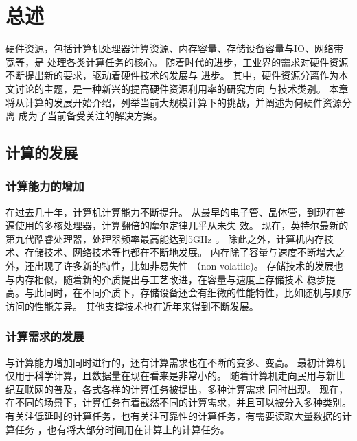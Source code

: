 \chapter{总述} %

\label{Chapter1} %

硬件资源，包括计算机处理器计算资源、内存容量、存储设备容量与IO、网络带宽等，是
处理各类计算任务的核心。
随着时代的进步，工业界的需求对硬件资源不断提出新的要求，驱动着硬件技术的发展与
进步。
其中，硬件资源分离作为本文讨论的主题，是一种新兴的提高硬件资源利用率的研究方向
与技术类别。
本章将从计算的发展开始介绍，列举当前大规模计算下的挑战，并阐述为何硬件资源分离
成为了当前备受关注的解决方案。

\section{计算的发展}

\subsection{计算能力的增加}

在过去几十年，计算机计算能力不断提升。
从最早的电子管、晶体管，到现在普遍使用的多核处理器，计算翻倍的摩尔定律几乎从未失
效。
现在，英特尔最新的第九代酷睿处理器，处理器频率最高能达到5GHz
\cite{intel2018corei9}。
除此之外，计算机内存技术、存储技术、网络技术等也都在不断地发展。
内存除了容量与速度不断增大之外，还出现了许多新的特性，比如非易失性
（non-volatile)\cite{wikipedia2019nvm}。
存储技术的发展也与内存相似，随着新的介质提出与工艺改进，在容量与速度上存储技术
稳步提高。与此同时，在不同介质下，存储设备还会有细微的性能特性，比如随机与顺序
访问的性能差异。
其他支撑技术也在近年来得到不断发展。

\subsection{计算需求的发展}

与计算能力增加同时进行的，还有计算需求也在不断的变多、变高。
最初计算机仅用于科学计算，且数据量在现在看来是非常小的。
随着计算机走向民用与新世纪互联网的普及，各式各样的计算任务被提出，多种计算需求
同时出现。
现在，在不同的场景下，计算任务有着截然不同的计算需求，并且可以被分入多种类别。
有关注低延时的计算任务，也有关注可靠性的计算任务，有需要读取大量数据的计算任务
，也有将大部分时间用在计算上的计算任务。

